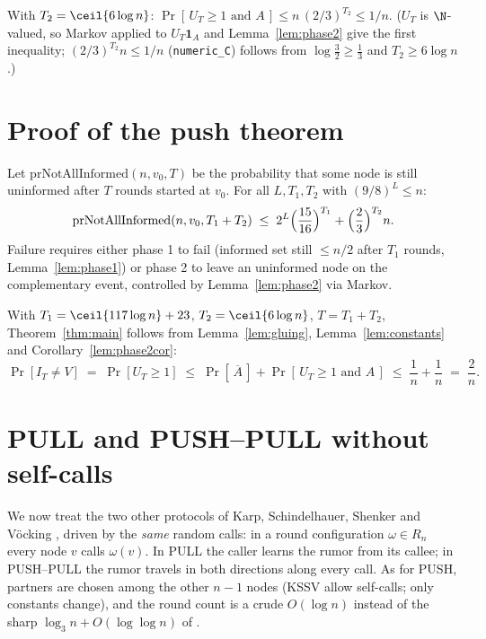 \begin{corollary}\label{lem:phase2cor}
  \leanok
  With $T_2 = \ceil{6 \log n}$: $\Pr[\, U_T \ge 1 \text{ and } A \,]
    \le n\,(2/3)^{T_2} \le 1/n$. ($U_T$ is $\N$-valued, so Markov applied to
  $U_T \mathbf{1}_A$ and Lemma~\ref{lem:phase2} give the first inequality;
  $(2/3)^{T_2} n \le 1/n$ (\texttt{numeric\_C}) follows from
  $\log\tfrac32 \ge \tfrac13$ and $T_2 \ge 6\log n$.)
\end{corollary}

\section{Proof of the push theorem}\label{sec:proof-main}

\begin{lemma}\label{lem:gluing}
  \leanok
  Let $\mathrm{prNotAllInformed}(n,v_0,T)$ be the probability that some node
  is still uninformed after $T$ rounds started at $v_0$. For all
  $L, T_1, T_2$ with $(9/8)^L \le n$:
  \[
    \mathrm{prNotAllInformed}(n,v_0,T_1+T_2) \;\le\;
      2^{L}\Bigl(\frac{15}{16}\Bigr)^{T_1} + \Bigl(\frac23\Bigr)^{T_2} n.
  \]
  Failure requires either phase 1 to fail (informed set still $\le n/2$
  after $T_1$ rounds, Lemma~\ref{lem:phase1}) or phase 2 to leave an
  uninformed node on the complementary event, controlled by
  Lemma~\ref{lem:phase2} via Markov.
\end{lemma}

With $T_1 = \ceil{117\log n} + 23$, $T_2 = \ceil{6\log n}$, $T = T_1+T_2$,
Theorem~\ref{thm:main} follows from Lemma~\ref{lem:gluing},
Lemma~\ref{lem:constants} and Corollary~\ref{lem:phase2cor}:
\[
  \Pr[I_T \ne V] \;=\; \Pr[U_T \ge 1]
  \;\le\; \Pr[\,\overline{A}\,] + \Pr[\,U_T \ge 1 \text{ and } A\,]
  \;\le\; \frac1n + \frac1n \;=\; \frac2n .
\]

\section{PULL and PUSH--PULL without self-calls}\label{sec:pull}

We now treat the two other protocols of Karp, Schindelhauer, Shenker and
V\"ocking \cite{KSSV00}, driven by the \emph{same} random calls: in a round
configuration $\omega \in R_n$ every node $v$ calls $\omega(v)$. In PULL the
caller learns the rumor from its callee; in PUSH--PULL the rumor travels in
both directions along every call. As for PUSH, partners are chosen among the
other $n-1$ nodes (KSSV allow self-calls; only constants change), and the
round count is a crude $O(\log n)$ instead of the sharp
$\log_3 n + O(\log\log n)$ of \cite[Thm.~2.1]{KSSV00}.

